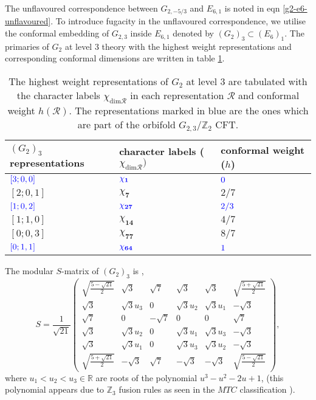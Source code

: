 \documentclass[a4paper,12pt]{article}
\begin{document}
The unflavoured correspondence between $G_{2,-5/3}$ and $E_{6,1}$ is noted in eqn \eqref{g2-e6-unflavoured}. To introduce fugacity in the unflavoured correspondence, we utilise the conformal embedding of $G_{2,3}$ inside $E_{6,1}$ denoted by $(G_2)_3\subset(E_6)_1$. The primaries of $G_2$ at level 3 theory with the highest weight representations and corresponding conformal dimensions are written in table \ref{G_2_3_reps}.
%

\begin{table}
\centering
\begin{tabularx}{0.8\textwidth} { 
  | >{\centering\arraybackslash}X 
  | >{\centering\arraybackslash}X 
  | >{\centering\arraybackslash}X | }
 \hline
 $(G_2)_3$ representations & character labels ($\chi_{\mathrm{dim}\mathcal{R}})$ & conformal weight ($h$) \\
\hline
$\textcolor{blue}{[3;0,0]}$  & $\textcolor{blue}{\chi_\mathbf{1}}$  & $\textcolor{blue}{0}$ \\
\hline
$[2;0,1]$  & $\chi_\mathbf{7}$  & $2/7$ \\
\hline
$\textcolor{blue}{[1;0,2]}$  & $\textcolor{blue}{\chi_\mathbf{27}}$  & $\textcolor{blue}{2/3}$ \\
\hline
$[1;1,0]$  & $\chi_\mathbf{14}$  & $4/7$ \\
\hline
$[0;0,3]$  & $\chi_\mathbf{77}$  & $8/7$ \\
\hline
$\textcolor{blue}{[0;1,1]}$  & $\textcolor{blue}{\chi_\mathbf{64}}$  & $\textcolor{blue}{1}$ \\
\hline
\end{tabularx}
\caption{The highest weight representations of $G_2$ at level 3 are tabulated with the character labels $\chi_{\mathrm{dim}\mathcal{R}}$ in each representation $\mathcal{R}$ and conformal weight $h(\mathcal{R})$. The representations marked in blue are the ones which are part of the orbifold $G_{2,3}/\mathbb{Z}_2$ CFT.}
\label{G_2_3_reps}
\end{table}
%
The modular $S$-matrix of $(G_2)_3$ is \cite{Coquereaux:2010we},
%
\begin{equation}
    S=\frac{1}{\sqrt{21}}\begin{pmatrix}
\sqrt{\frac{5-\sqrt{21}}{2}} & \sqrt{3} & \sqrt{7} & \sqrt{3} & \sqrt{3} & \sqrt{\frac{5+\sqrt{21}}{2}}\\
\sqrt{3} & \sqrt{3}u_3 & 0 & \sqrt{3}u_2 & \sqrt{3}u_1 & -\sqrt{3} \\
\sqrt{7} & 0 & -\sqrt{7} & 0 & 0 & \sqrt{7} \\
\sqrt{3} & \sqrt{3}u_2 & 0 & \sqrt{3}u_1 & \sqrt{3}u_3 & -\sqrt{3} \\
\sqrt{3} & \sqrt{3}u_1 & 0 & \sqrt{3}u_3 & \sqrt{3}u_2 & -\sqrt{3} \\
\sqrt{\frac{5+\sqrt{21}}{2}} & -\sqrt{3}& \sqrt{7} & -\sqrt{3} & -\sqrt{3} & \sqrt{\frac{5-\sqrt{21}}{2}}
\end{pmatrix},
\end{equation}
%
where $u_1<u_2<u_3\in\mathbb{R}$ are roots of the polynomial $u^3-u^2-2u+1$, (this polynomial appears due to $\mathbb{Z}_3$ fusion rules as seen in the $MTC$ classification \cite{rowell2009classification}). 
\end{document}
